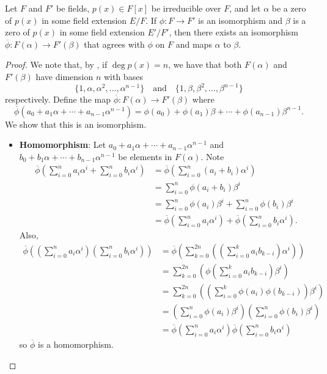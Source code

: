 \begin{lemma}\label{lemma-isomorphism-extension}
    Let $F$ and $F'$ be fields, $p(x) \in F[x]$ be irreducible over $F$, and let $\alpha$ be a zero of $p(x)$ in some field extension $E/F$. If $\phi: F \to F'$ is an isomorphism and $\beta$ is a zero of $p(x)$ in some field extension $E'/F'$, then there exists an isomorphism $\overline{\phi}: F(\alpha) \to F'(\beta)$ that agrees with $\phi$ on $F$ and maps $\alpha$ to $\beta$.
\end{lemma}
\begin{proof}
    We note that, by , if $\deg p(x) = n$, we have that both $F(\alpha)$ and $F'(\beta)$ have dimension $n$ with bases
    \[
        \{1, \alpha, \alpha^2, \dots, \alpha^{n-1}\} \quad\text{and}\quad\{1, \beta, \beta^2, \dots, \beta^{n-1}\}
    \]
    respectively. Define the map $\overline{\phi}: F(\alpha) \to F'(\beta)$ where
    \[
        \overline{\phi}\left(a_0 + a_1\alpha + \cdots + a_{n-1}\alpha^{n-1}\right) = \phi(a_0) + \phi(a_1)\beta + \cdots + \phi(a_{n-1})\beta^{n-1}.
    \]
    We show that this is an isomorphism.
    \begin{itemize}
        \item \textbf{Homomorphism}: Let $a_0 + a_1\alpha + \cdots + a_{n-1}\alpha^{n-1}$ and $b_0 + b_1\alpha + \cdots + b_{n-1}\alpha^{n-1}$ be elements in $F(\alpha)$. Note
        \begin{align*}
            \overline{\phi}\left(\sum_{i=0}^na_i\alpha^i + \sum_{i=0}^nb_i\alpha^i\right) &=\overline{\phi}\left(\sum_{i=0}^n(a_i+b_i)\alpha^i\right)\\
            &=\sum_{i=0}^n\phi(a_i+b_i)\beta^i\\
            &= \sum_{i=0}^n\phi(a_i)\beta^i + \sum_{i=0}^n\phi(b_i)\beta^i\\
            &= \overline{\phi}\left(\sum_{i=0}^na_i\alpha^i\right) + \overline{\phi}\left(\sum_{i=0}^nb_i\alpha^i\right).
        \end{align*}
        Also,
        \begin{align*}
            \overline{\phi}\left(\left(\sum_{i=0}^na_i\alpha^i\right)\left(\sum_{i=0}^nb_i\alpha^i\right)\right) &= \overline{\phi}\left(\sum_{k=0}^{2n}\left(\left(\sum_{i=0}^ka_ib_{k-i}\right)\alpha^i\right)\right)\\
            &= \sum_{k=0}^{2n}\left(\phi\left(\sum_{i=0}^ka_ib_{k-i}\right)\beta^i\right)\\
            &= \sum_{k=0}^{2n}\left(\left(\sum_{i=0}^k\phi(a_i)\phi(b_{k-i})\right)\beta^i\right)\\
            &=\left(\sum_{i=0}^n\phi(a_i)\beta^i\right)\left(\sum_{i=0}^n\phi(b_i)\beta^i\right)\\
            &= \overline{\phi}\left(\sum_{i=0}^na_i\alpha^i\right)\overline{\phi}\left(\sum_{i=0}^nb_i\alpha^i\right)
        \end{align*}
        so $\overline{\phi}$ is a homomorphism.


\end{itemize}
\end{proof}
